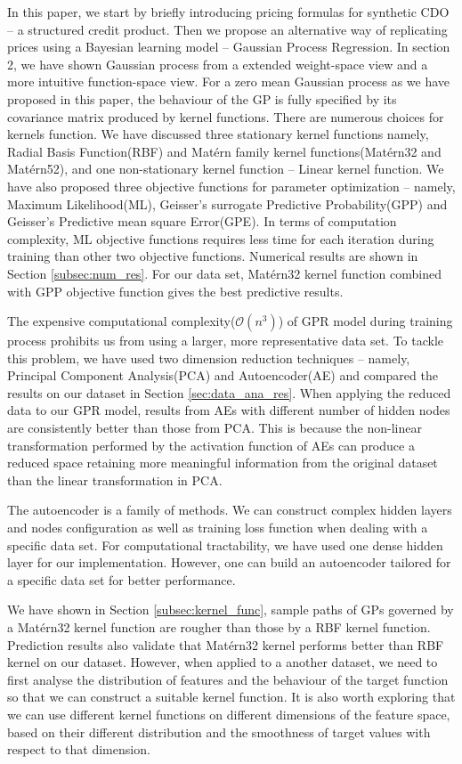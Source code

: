 \documentclass[11pt,a4paper]{article}
\theoremstyle{definition}
\numberwithin{equation}{section}
\begin{document}
		In this paper, we start by briefly introducing pricing formulas for synthetic CDO -- a structured credit product. Then we propose an alternative way of replicating prices using a Bayesian learning model -- Gaussian Process Regression. In section 2, we have shown Gaussian process from a extended weight-space view and a more intuitive function-space view. For a zero mean Gaussian process as we have proposed in this paper, the behaviour of the GP is fully specified by its covariance matrix produced by kernel functions. There are numerous choices for kernels function. We have discussed three stationary kernel functions namely, Radial Basis Function(RBF) and Mat\'ern family kernel functions(Mat\'ern32 and Mat\'ern52), and one non-stationary kernel function -- Linear kernel function. We have also proposed three objective functions for parameter optimization -- namely, Maximum Likelihood(ML), Geisser's surrogate  Predictive Probability(GPP) and Geisser's Predictive mean square Error(GPE). In terms of computation complexity, ML objective functions requires less time for each iteration during training than other two objective functions. Numerical results are shown in Section \ref{subsec:num_res}. For our data set, Mat\'ern32 kernel function combined with GPP objective function gives the best predictive results.
		
		The expensive computational complexity($\mathcal O(n^3)$) of GPR model during training process prohibits us from using a larger, more representative data set. To tackle this problem, we have used two dimension reduction techniques -- namely, Principal Component Analysis(PCA) and Autoencoder(AE) and compared the results on our dataset in Section \ref{sec:data_ana_res}. When applying the reduced data to our GPR model, results from AEs with different number of hidden nodes are consistently better than those from PCA. This is because the non-linear transformation performed by the activation function of AEs can produce a reduced space retaining more meaningful information from the original dataset than  the linear transformation in PCA.
		
		The autoencoder is a family of methods. We can construct complex hidden layers and nodes configuration as well as training loss function when dealing with a specific data set. For computational tractability, we have used one dense hidden layer for our implementation. However, one can build an autoencoder tailored for a specific data set for better performance. 
		
		We have shown in Section \ref{subsec:kernel_func}, sample paths of GPs governed by a Mat\'ern32 kernel function are rougher than those by a RBF kernel function. Prediction results also validate that Mat\'ern32 kernel performs better than RBF kernel on our dataset. However, when applied to a another dataset, we need to first analyse the distribution of features and the behaviour of the target function so that we can construct a suitable kernel function. It is also worth exploring that we can use different kernel functions on different dimensions of the feature space, based on their different distribution and the smoothness of target values with respect to that dimension.
		
\end{document}
